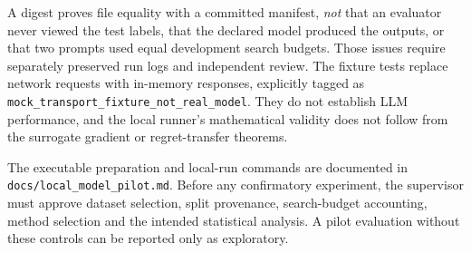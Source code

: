 A digest proves file equality with a committed manifest, \emph{not}
that an evaluator never viewed the test labels, that the declared
model produced the outputs, or that two prompts used equal development
search budgets. Those issues require separately preserved run logs and
independent review. The fixture tests replace network requests with
in-memory responses, explicitly tagged as \texttt{mock\_transport\_fixture\_not\_real\_model}.
They do not establish LLM performance, and the local runner's
mathematical validity does not follow from the surrogate gradient
or regret-transfer theorems.

The executable preparation and local-run commands are documented in
\texttt{docs/local\_model\_pilot.md}. Before any confirmatory
experiment, the supervisor must approve dataset selection, split
provenance, search-budget accounting, method selection and the intended
statistical analysis. A pilot evaluation without these controls can
be reported only as exploratory.
